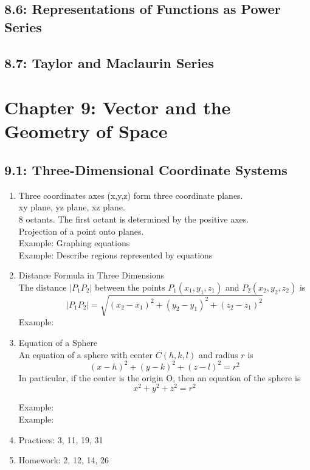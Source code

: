 \documentclass[12pt]{amsart}
\begin{document}
\newpage
\subsection{8.6: Representations of Functions  as Power Series}

\newpage
\subsection{8.7: Taylor and Maclaurin Series}

\newpage
\section{Chapter 9: Vector and the Geometry of Space}

\subsection{9.1: Three-Dimensional Coordinate Systems}
	\begin{enumerate}
		\item Three coordinates axes (x,y,z) form three coordinate planes.\\
			xy plane, yz plane, xz plane. \\
			
			8 octants. The first octant is determined by the positive axes. \\
			
			Projection of a point onto planes. \\
			
			Example: Graphing equations \\
			 
			Example: Describe regions represented by equations\\
		\item Distance Formula in Three Dimensions \\
				The distance $|P_1P_2|$ between the points $P_1(x_1,y_1,z_1)$ and $P_2(x_2,y_2,z_2)$ is\\
				\[
				|P_1P_2| = \sqrt{(x_2  - x_1)^2 + (y_2 - y_1)^2 + (z_2 - z_1)^2}
				\]
				Example: \\
		\item Equation of a Sphere \\
				An equation of a sphere with center $C(h,k,l)$ and radius $r$ is 
				\[
				(x-h)^2 + (y-k)^2 + (z-l)^2 = r^2
				\]
				In particular, if the center is the origin O, then an equation of the sphere is 
				\[
				x^2 + y^2 + z^2 = r^2
				\]	
				
				Example: \\
				
				Example: \\
			\item Practices: 3, 11, 19, 31 \\
			
			\item Homework:  2, 12, 14, 26\\
	\end{enumerate}
\newpage
\end{document}
